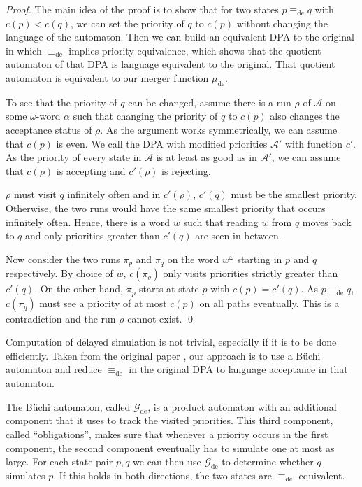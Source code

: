\begin{proof}
	The main idea of the proof is to show that for two states $p \equiv_\text{de} q$ with $c(p) < c(q)$, we can set the priority of $q$ to $c(p)$ without changing the language of the automaton. Then we can build an equivalent DPA to the original in which $\equiv_\text{de}$ implies priority equivalence, which shows that the quotient automaton of that DPA is language equivalent to the original. That quotient automaton is equivalent to our merger function $\mu_\text{de}$.
	
	To see that the priority of $q$ can be changed, assume there is a run $\rho$ of $\mathcal{A}$ on some $\omega$-word $\alpha$ such that changing the priority of $q$ to $c(p)$ also changes the acceptance status of $\rho$. As the argument works symmetrically, we can assume that $c(p)$ is even. We call the DPA with modified priorities $\mathcal{A}'$ with function $c'$. As the priority of every state in $\mathcal{A}$ is at least as good as in $\mathcal{A}'$, we can assume that $c(\rho)$ is accepting and $c'(\rho)$ is rejecting.
	
	$\rho$ must visit $q$ infinitely often and in $c'(\rho)$, $c'(q)$ must be the smallest priority. Otherwise, the two runs would have the same smallest priority that occurs infinitely often. Hence, there is a word $w$ such that reading $w$ from $q$ moves back to $q$ and only priorities greater than $c'(q)$ are seen in between. 
	
	Now consider the two runs $\pi_p$ and $\pi_q$ on the word $w^\omega$ starting in $p$ and $q$ respectively. By choice of $w$, $c(\pi_q)$ only visits priorities strictly greater than $c'(q)$. On the other hand, $\pi_p$ starts at state $p$ with $c(p) = c'(q)$. As $p \equiv_\text{de} q$, $c(\pi_q)$ must see a priority of at most $c(p)$ on all paths eventually. This is a contradiction and the run $\rho$ cannot exist. \qed
\end{proof}

Computation of delayed simulation is not trivial, especially if it is to be done efficiently. Taken from the original paper \cite{FritzWilke06}, our approach is to use a B\"uchi automaton and reduce $\equiv_\text{de}$ in the original DPA to language acceptance in that automaton.

The B\"uchi automaton, called $\mathcal{G}_\text{de}$, is a product automaton with an additional component that it uses to track the visited priorities. This third component, called \enquote{obligations}, makes sure that whenever a priority occurs in the first component, the second component eventually has to simulate one at most as large. For each state pair $p, q$ we can then use $\mathcal{G}_\text{de}$ to determine whether $q$ simulates $p$. If this holds in both directions, the two states are $\equiv_\text{de}$-equivalent.

